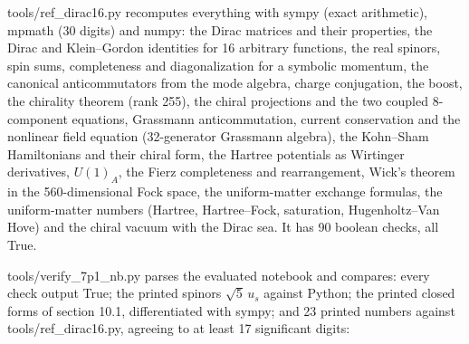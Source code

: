 \documentclass[10pt,a4paper]{article}
\begin{document}
tools/ref\_dirac16.py recomputes everything with sympy (exact arithmetic), mpmath (30 digits) and numpy: the Dirac matrices and their properties, the Dirac and Klein–Gordon identities for 16 arbitrary functions, the real spinors, spin sums, completeness and diagonalization for a symbolic momentum, the canonical anticommutators from the mode algebra, charge conjugation, the boost, the chirality theorem (rank 255), the chiral projections and the two coupled 8-component equations, Grassmann anticommutation, current conservation and the nonlinear field equation (32-generator Grassmann algebra), the Kohn–Sham Hamiltonians and their chiral form, the Hartree potentials as Wirtinger derivatives, $U(1)_A$, the Fierz completeness and rearrangement, Wick’s theorem in the 560-dimensional Fock space, the uniform-matter exchange formulas, the uniform-matter numbers (Hartree, Hartree–Fock, saturation, Hugenholtz–Van Hove) and the chiral vacuum with the Dirac sea. It has 90 boolean checks, all True.

tools/verify\_7p1\_nb.py parses the evaluated notebook and compares: every check output True; the printed spinors $\sqrt5\,u_s$ against Python; the printed closed forms of section 10.1, differentiated with sympy; and 23 printed numbers against tools/ref\_dirac16.py, agreeing to at least 17 significant digits:
\end{document}

